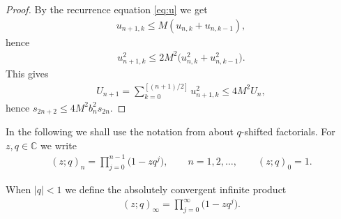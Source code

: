 \begin{proof} By the recurrence equation \eqref{eq:u} we get
\begin{gather*}
u_{n+1,k}\le M(u_{n,k}+u_{n,k-1}),
\end{gather*}
hence
\begin{gather*}
u_{n+1,k}^2\le 2M^2\big(u_{n,k}^2+u_{n,k-1}^2\big).
\end{gather*}
This gives
\begin{gather*}
U_{n+1}=\sum_{k=0}^{[(n+1)/2]} u_{n+1,k}^2\le 4M^2 U_n,
\end{gather*}
hence $s_{2n+2}\le 4M^2b_n^2s_{2n}$.
\end{proof}

In the following we shall use the notation from \cite{G:R} about $q$-shifted factorials. For $z,q\in\mathbb C$ we write
\begin{gather}\label{eq:qshift}
(z;q)_n=\prod_{j=0}^{n-1}\big(1-zq^{j}\big),\qquad n=1,2,\ldots,\qquad (z;q)_0=1.
\end{gather}

When $|q|<1$ we define the absolutely convergent infinite product
\begin{gather}\label{eq:q-infty}
(z;q)_{\infty}=\prod_{j=0}^\infty\big(1-zq^j\big).
\end{gather}

